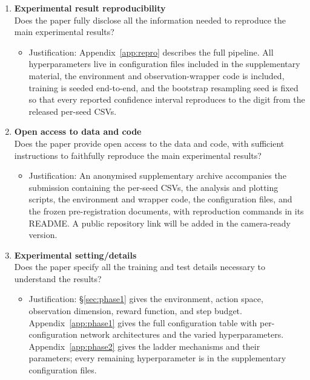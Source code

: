 \begin{enumerate}
\item {\bf Experimental result reproducibility}\\
Does the paper fully disclose all the information needed to reproduce the main experimental
results?
\answerYes{}
\begin{itemize}
\item[] Justification: Appendix~\ref{app:repro} describes the full pipeline. All
  hyperparameters live in configuration files included in the supplementary material, the
  environment and observation-wrapper code is included, training is seeded end-to-end, and the
  bootstrap resampling seed is fixed so that every reported confidence interval reproduces to
  the digit from the released per-seed CSVs.
\end{itemize}

\item {\bf Open access to data and code}\\
Does the paper provide open access to the data and code, with sufficient instructions to
faithfully reproduce the main experimental results?
\answerYes{}
\begin{itemize}
\item[] Justification: An anonymised supplementary archive accompanies the submission
  containing the per-seed CSVs, the analysis and plotting scripts, the environment and wrapper
  code, the configuration files, and the frozen pre-registration documents, with reproduction
  commands in its README. A public repository link will be added in the camera-ready version.
\end{itemize}

\item {\bf Experimental setting/details}\\
Does the paper specify all the training and test details necessary to understand the results?
\answerYes{}
\begin{itemize}
\item[] Justification: \S\ref{sec:phase1} gives the environment, action space, observation
  dimension, reward function, and step budget. Appendix~\ref{app:phase1} gives the full
  configuration table with per-configuration network architectures and the varied
  hyperparameters. Appendix~\ref{app:phase2} gives the ladder mechanisms and their parameters;
  every remaining hyperparameter is in the supplementary configuration files.
\end{itemize}


\end{enumerate}
